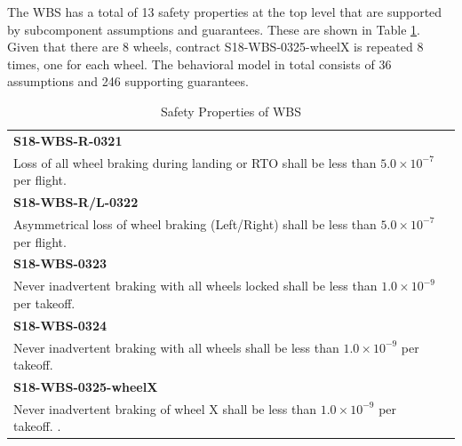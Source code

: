 The WBS has a total of 13 safety properties at the top level that are supported by subcomponent assumptions and guarantees. These are shown in Table \ref{tab:safetyProperties}. Given that there are 8 wheels, contract S18-WBS-0325-wheelX is repeated 8 times, one for each wheel. The behavioral model in total consists of 36 assumptions and 246 supporting guarantees.
\begin{center}
\begin{table}[htbp]
\begin{tabular}{@{}ll}
\toprule
\textbf{S18-WBS-R-0321} \\Loss of all wheel braking during landing or RTO shall be less than $5.0 \times 10^{-7}$ per flight.                                    \\ \midrule 
\textbf{S18-WBS-R/L-0322}  \\ Asymmetrical loss of wheel braking (Left/Right) shall be less than $5.0 \times 10^{-7}$ per flight. \\ \midrule
\textbf{S18-WBS-0323} \\ Never inadvertent braking with all wheels locked shall be less than $1.0 \times 10^{-9}$ per takeoff.                                                                                                                                                                                                               \\ \midrule
\textbf{S18-WBS-0324}  \\ Never inadvertent braking with all wheels shall be less than $1.0 \times 10^{-9}$ per takeoff.                                                                                                            \\ \midrule
\textbf{S18-WBS-0325-wheelX} \\ Never inadvertent braking of wheel X shall be less than $1.0 \times 10^{-9}$ per takeoff.                                                                                                           .                                                                                                                 \\ \bottomrule
\end{tabular}
\caption{Safety Properties of WBS}
\label{tab:safetyProperties}
\end{table} 
\end{center} 

